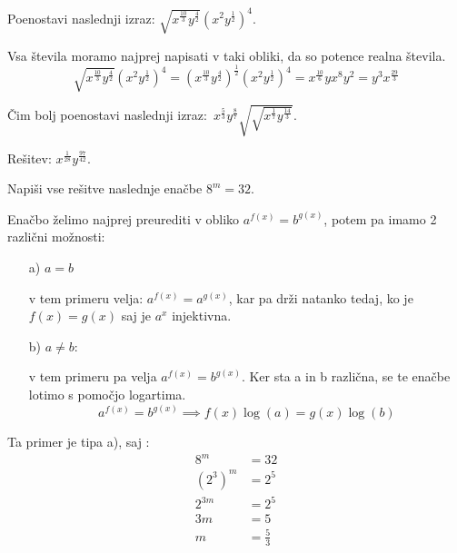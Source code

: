 %

\begin{vaja}
 Poenostavi naslednji izraz: \(\sqrt{x^{\frac{10}{3}}y^{\frac{4}{2}}}(x^{2}y^{\frac{1}{2}})^{4}\).

  \begin{odgovor}
   Vsa števila moramo najprej napisati v taki obliki, da so potence realna števila. 
	$$\sqrt{x^{\frac{10}{3}}y^{\frac{4}{2}}}(x^{2}y^{\frac{1}{2}})^{4}=(x^{\frac{10}{3}}y^{\frac{4}{2}})^{\frac{1}{2}}(x^{2}y^{\frac{1}{2}})^{4}=x^{\frac{10}{6}}yx^{8}y^{2}=y^{3}x^{\frac{29}{3}}$$
  \end{odgovor}
\end{vaja}

\begin{vaja}
  Čim bolj poenostavi naslednji izraz: \(\,x^{\frac{5}{3}}y^{\frac{8}{7}}\sqrt{\sqrt{x^{\frac{1}{7}}y^{\frac{14}{3}}}}\).

  \begin{odgovor}
   Rešitev: $x^{\frac{1}{28}} y^{\frac{97}{42}}$.
  \end{odgovor}
\end{vaja}

\begin{vaja}
  Napiši vse rešitve naslednje enačbe \( 8^m=32\).

  \begin{odgovor}
   Enačbo želimo najprej  preurediti v obliko $a^{f(x)}=b^{g(x)}$, potem pa imamo 2 različni možnosti:
	\begin{itemize}
		\item[a)] $a=b$ 

			v tem primeru velja: $a^{f(x)}=a^{g(x)}$, kar pa drži natanko tedaj, ko je $f(x)=g(x)$ saj je $a^x$ injektivna.
			
		\item[b)] $a\neq b$:
			
			v tem primeru pa velja $a^{f(x)}=b^{g(x)}$. Ker sta a in b različna, se te enačbe lotimo s pomočjo logartima.
			$$a^{f(x)}=b^{g(x)}\implies f(x)\log(a)=g(x)\log(b)$$
	\end{itemize}
	
	Ta primer je tipa a), saj :
	\begin{align*}
		8^m&=32\\
		(2^3)^m&=2^5\\
		2^{3m}&=2^5\\
		3m&=5\\
		m&=\frac{5}{3}
	\end{align*}
  \end{odgovor}
\end{vaja}


